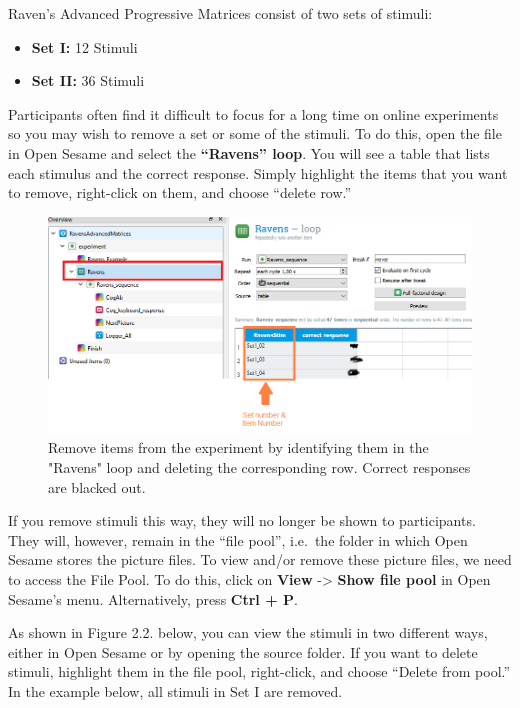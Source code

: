 \documentclass[
]{book}
\providecommand{\tightlist}{%
  \setlength{\itemsep}{0pt}\setlength{\parskip}{0pt}}
\begin{document}
Raven's Advanced Progressive Matrices consist of two sets of stimuli:

\begin{itemize}
\tightlist
\item
  \textbf{Set I:} 12 Stimuli
\item
  \textbf{Set II:} 36 Stimuli
\end{itemize}

Participants often find it difficult to focus for a long time on online experiments so you may wish to remove a set or some of the stimuli. To do this, open the file in Open Sesame and select the \textbf{``Ravens'' loop}. You will see a table that lists each stimulus and the correct response. Simply highlight the items that you want to remove, right-click on them, and choose ``delete row.''

\begin{figure}

{\centering \includegraphics[width=0.99\linewidth]{images/AdvancedRPM} 

}

\caption{Remove items from the experiment by identifying them in the "Ravens" loop and deleting the corresponding row. Correct responses are blacked out.}\label{fig:Figure1-1}
\end{figure}

If you remove stimuli this way, they will no longer be shown to participants. They will, however, remain in the ``file pool'', i.e.~the folder in which Open Sesame stores the picture files. To view and/or remove these picture files, we need to access the File Pool. To do this, click on \textbf{View} -\textgreater{} \textbf{Show file pool} in Open Sesame's menu. Alternatively, press \textbf{Ctrl + P}.

As shown in Figure 2.2. below, you can view the stimuli in two different ways, either in Open Sesame or by opening the source folder. If you want to delete stimuli, highlight them in the file pool, right-click, and choose ``Delete from pool.'' In the example below, all stimuli in Set I are removed.
\end{document}
